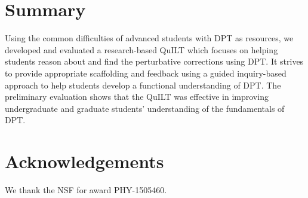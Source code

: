 \documentclass[aps,pra,showpacs,showkeys,twocolumn,groupedaddress]{revtex4-1}
\begin{document}
\vspace*{-.2in}
\section{Summary}
\vspace*{-.1in}
Using the common difficulties of advanced students with DPT as resources, we developed and evaluated a research-based QuILT which focuses on helping students reason about and find the perturbative corrections using DPT.
It strives to provide appropriate scaffolding and feedback using a guided inquiry-based approach to help students develop a functional understanding of DPT.  The preliminary evaluation shows that the QuILT was effective in improving undergraduate and graduate students' understanding of the fundamentals of DPT.  

\vspace*{-.2in}
\section*{Acknowledgements}
\vspace*{-.1in}
We thank the NSF for award PHY-1505460.
\vspace*{-.27in} 
\end{document}
